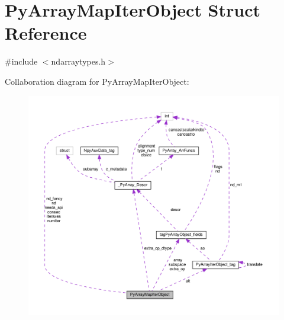 \hypertarget{structPyArrayMapIterObject}{}\section{Py\+Array\+Map\+Iter\+Object Struct Reference}
\label{structPyArrayMapIterObject}


{\ttfamily \#include $<$ndarraytypes.\+h$>$}



Collaboration diagram for Py\+Array\+Map\+Iter\+Object\+:
\nopagebreak
\begin{figure}[H]
\begin{center}
\leavevmode
\includegraphics[width=350pt]{structPyArrayMapIterObject__coll__graph}
\end{center}
\end{figure}
